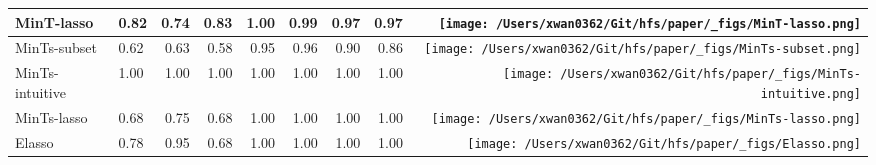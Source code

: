 \documentclass[11pt,a4paper,]{article}
\begin{document}
\begin{table}[!h]
{\begin{tabular}{llrrrrrr>{}r}
MinT-lasso & 0.82 & 0.74 & 0.83 & 1.00 & 0.99 & 0.97 & 0.97 & \texttt{[image: /Users/xwan0362/Git/hfs/paper/\_figs/MinT-lasso.png]}\\
\midrule
MinTs-subset & 0.62 & 0.63 & 0.58 & 0.95 & 0.96 & 0.90 & 0.86 & \texttt{[image: /Users/xwan0362/Git/hfs/paper/\_figs/MinTs-subset.png]}\\
MinTs-intuitive & 1.00 & 1.00 & 1.00 & 1.00 & 1.00 & 1.00 & 1.00 & \texttt{[image: /Users/xwan0362/Git/hfs/paper/\_figs/MinTs-intuitive.png]}\\
MinTs-lasso & 0.68 & 0.75 & 0.68 & 1.00 & 1.00 & 1.00 & 1.00 & \texttt{[image: /Users/xwan0362/Git/hfs/paper/\_figs/MinTs-lasso.png]}\\
\midrule
Elasso & 0.78 & 0.95 & 0.68 & 1.00 & 1.00 & 1.00 & 1.00 & \texttt{[image: /Users/xwan0362/Git/hfs/paper/\_figs/Elasso.png]}\\
\bottomrule
\end{tabular}}
\end{table}
\end{document}
